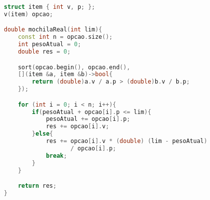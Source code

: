 \begin{lstlisting}[language=c++, title=consegue quebrar os itens para caber]
struct item { int v, p; };
v(item) opcao;

double mochilaReal(int lim){
	const int n = opcao.size();
	int pesoAtual = 0; 
	double res = 0;

	sort(opcao.begin(), opcao.end(), 
	[](item &a, item &b)->bool{
		return (double)a.v / a.p > (double)b.v / b.p;
	});

	for (int i = 0; i < n; i++){
		if(pesoAtual + opcao[i].p <= lim){
			pesoAtual += opcao[i].p;
			res += opcao[i].v;
		}else{
			res += opcao[i].v * (double) (lim - pesoAtual) 
			       / opcao[i].p;
			break;
		}
	}

	return res;
}
\end{lstlisting}